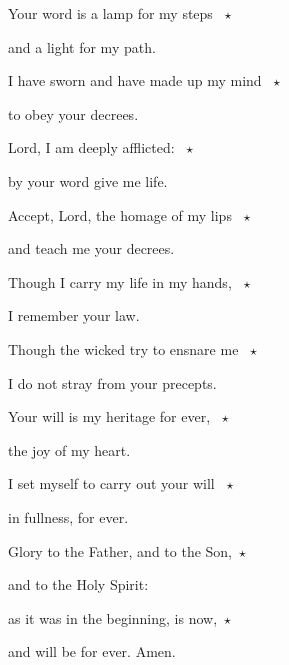 \noindent Your word is a lamp for my steps ~$\star$~\nopagebreak

and a light for my path.

\noindent I have sworn and have made up my mind ~$\star$~\nopagebreak

to obey your decrees.

\noindent Lord, I am deeply afflicted: ~$\star$~\nopagebreak

by your word give me life.

\noindent Accept, Lord, the homage of my lips ~$\star$~\nopagebreak

and teach me your decrees.

\noindent Though I carry my life in my hands, ~$\star$~\nopagebreak

I remember your law.

\noindent Though the wicked try to ensnare me ~$\star$~\nopagebreak

I do not stray from your precepts.

\noindent Your will is my heritage for ever, ~$\star$~\nopagebreak

the joy of my heart.

\noindent I set myself to carry out your will ~$\star$~\nopagebreak

in fullness, for ever.



\noindent Glory to the Father, and to the Son,~$\star$~\nopagebreak

and to the Holy Spirit:

\noindent as it was in the beginning, is now,~$\star$~\nopagebreak

and will be for ever. Amen.
